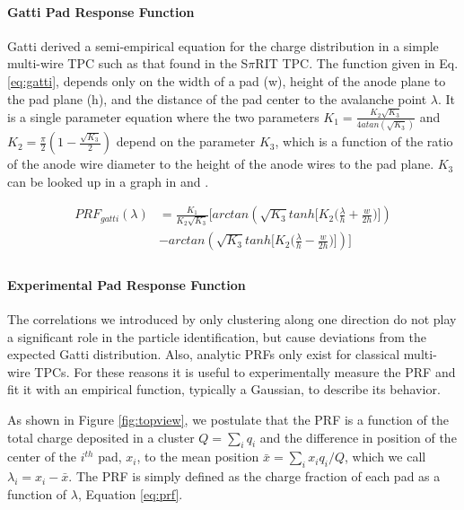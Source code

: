 \documentclass[review]{elsarticle}
\begin{document}
\paragraph{Gatti Pad Response Function}
Gatti \cite{gatti} derived a semi-empirical equation for the charge distribution in a simple multi-wire TPC such as that found in the S$\pi$RIT TPC. The function given in Eq. \ref{eq:gatti}, depends only on the width of a pad (w), height of the anode plane to the pad plane (h), and the distance of the pad center to the avalanche point $\lambda$. It is a single parameter equation where the two parameters $K_1 = \frac{K_{2}\sqrt{K_3}}{4 atan(\sqrt{K_3})}$ and $K_2 = \frac{\pi}{2}\left(1-\frac{\sqrt{K_{3}}}{2}\right)$ depend on the parameter $K_3$, which is a function of the ratio of the anode wire diameter to the height of the anode wires to the pad plane. $K_3$ can be looked up in a graph in \cite{blumrol} and \citep{gatti}.

\begin{equation}\label{eq:gatti}
\begin{split}
PRF_{gatti}(\lambda)
& = \frac{K_{1}}{K_{2}\sqrt{K_{3}}}\bigl[arctan(\sqrt{K_{3}}tanh\bigl[K_{2}\bigl(\frac{\lambda}{h}+\frac{w}{2h}\bigr)\bigr]) \\
& - arctan(\sqrt{K_{3}}tanh\bigl[K_{2}\bigl(\frac{\lambda}{h}-\frac{w}{2h}\bigr)\bigr])\bigr] \\
\end{split}
\end{equation}

\paragraph{Experimental Pad Response Function}

The correlations we introduced by only clustering along one direction do not play a significant role in the particle identification, but cause deviations from the expected Gatti distribution. Also, analytic PRFs only exist for classical multi-wire TPCs. For these reasons it is useful to experimentally measure the PRF and fit it with an empirical function, typically a Gaussian, to describe its behavior. 

As shown in Figure \ref{fig:topview}, we postulate that the PRF is a function of the total charge deposited in a cluster $Q = \sum_i q_i$ and the difference in position of the center of the $i^{th}$ pad, $x_i$, to the mean position $\bar{x} = \sum_i x_i q_i/Q$, which we call $\lambda_i = x_i-\bar{x}$. The PRF is simply defined as the charge fraction of each pad as a function of $\lambda$, Equation \ref{eq:prf}. 
\end{document}
